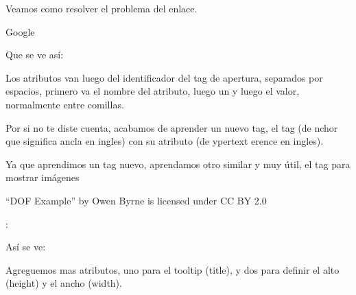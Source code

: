 \documentclass[letterpaper,10pt,spanish]{sphinxmanual}
\begin{document}
Veamos como resolver el problema del enlace.

%
\begin{sphinxVerbatim}[commandchars=\\\{\}]
 Google
\end{sphinxVerbatim}

Que se ve así:



Los atributos van luego del identificador del tag de apertura, separados por espacios, primero va el nombre del atributo, luego un \sphinxtitleref{=} y luego el valor, normalmente entre comillas.

Por si no te diste cuenta, acabamos de aprender un nuevo tag, el tag  (de
 nchor que significa ancla en ingles) con su atributo  (de 
ypertext  erence en ingles).

Ya que aprendimos un tag nuevo, aprendamos otro similar y muy útil, el tag para mostrar imágenes %
\begin{footnote}[1]\sphinxAtStartFootnote
“DOF Example” by Owen Byrne is licensed under CC BY 2.0
%
\end{footnote}:

%
\begin{sphinxVerbatim}[commandchars=\\\{\}]
 
\end{sphinxVerbatim}

Así se ve:



Agreguemos mas atributos, uno para el tooltip (title), y dos para definir el alto (height) y el ancho (width).

%
\begin{sphinxVerbatim}[commandchars=\\\{\}]
    
\end{sphinxVerbatim}
\end{document}
